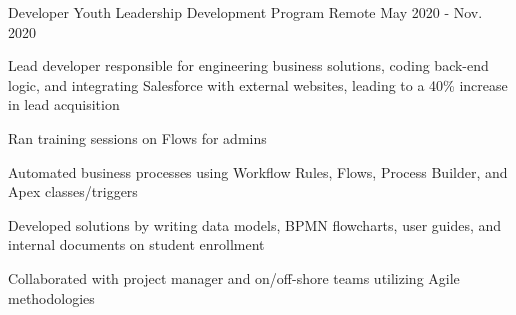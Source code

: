 \begin{cventries}
  \cventry
    {Developer} %
    {Youth Leadership Development Program} %
    {Remote} %
    {May 2020 - Nov. 2020} %
    {
      \begin{cvitems} %
        \item {Lead developer responsible for engineering business solutions, coding back-end logic, and integrating Salesforce with external websites, leading to a 40\% increase in lead acquisition}
        \item {Ran training sessions on Flows for admins}
        \item {Automated business processes using Workflow Rules, Flows, Process Builder, and Apex classes/triggers}
        \item {Developed solutions by writing data models, BPMN flowcharts, user guides, and internal documents on student enrollment}
        \item {Collaborated with project manager and on/off-shore teams utilizing Agile methodologies}
      \end{cvitems}
    }

\end{cventries}
